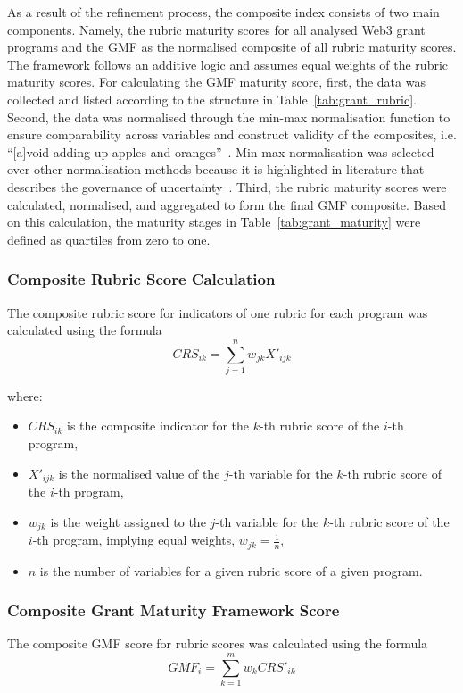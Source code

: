 \documentclass[conference]{IEEEtran}
\begin{document}
As a result of the refinement process, the composite index consists of two main components. Namely, the rubric maturity scores for all analysed Web3 grant programs and the GMF as the normalised composite of all rubric maturity scores. The framework follows an additive logic and assumes equal weights of the rubric maturity scores. For calculating the GMF maturity score, first, the data was collected and listed according to the structure in Table~\ref{tab:grant_rubric}. Second, the data was normalised through the min-max normalisation function to ensure comparability across variables and construct validity of the composites, i.e. “[a]void adding up apples and oranges”~\cite[p.~27]{oecd_handbook_2008}. Min-max normalisation was selected over other normalisation methods because it is highlighted in literature that describes the governance of uncertainty~\cite{winters_when_2004}. Third, the rubric maturity scores were calculated, normalised, and aggregated to form the final GMF composite. Based on this calculation, the maturity stages in Table~\ref{tab:grant_maturity} were defined as quartiles from zero to one.\\

\subsubsection{Composite Rubric Score Calculation}\label{sec_3.2.1}

The composite rubric score for indicators of one rubric for each program was calculated using the formula
\footnotesize
\[
CRS_{ik} = \sum_{j=1}^{n} w_{jk} X'_{ijk}
\]

where:

\begin{itemize}
    \item \( CRS_{ik} \) is the composite indicator for the \( k \)-th rubric score of the \( i \)-th program,
    \item \( X'_{ijk} \) is the normalised value of the \( j \)-th variable for the \( k \)-th rubric score of the \( i \)-th program,
    \item \( w_{jk} \) is the weight assigned to the \( j \)-th variable for the \( k \)-th rubric score of the \( i \)-th program, implying equal weights, \( w_{jk} = \frac{1}{n} \),
    \item \( n \) is the number of variables for a given rubric score of a given program.
\end{itemize}\vspace{7pt}
\normalsize
\subsubsection{Composite Grant Maturity Framework Score}\label{sec_3.2.2}
The composite GMF score for rubric scores was calculated using the formula
\footnotesize
\[
GMF_i = \sum_{k=1}^{m} w_k CRS'_{ik}
\]
\end{document}
